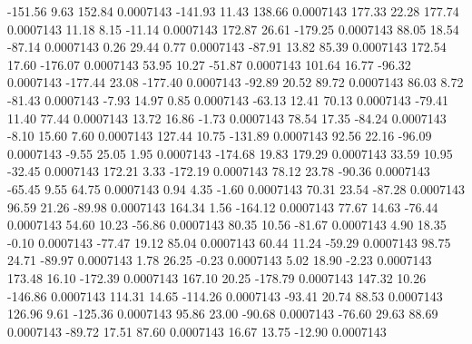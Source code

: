      -151.56        9.63      152.84     0.0007143
     -141.93       11.43      138.66     0.0007143
      177.33       22.28      177.74     0.0007143
       11.18        8.15      -11.14     0.0007143
      172.87       26.61     -179.25     0.0007143
       88.05       18.54      -87.14     0.0007143
        0.26       29.44        0.77     0.0007143
      -87.91       13.82       85.39     0.0007143
      172.54       17.60     -176.07     0.0007143
       53.95       10.27      -51.87     0.0007143
      101.64       16.77      -96.32     0.0007143
     -177.44       23.08     -177.40     0.0007143
      -92.89       20.52       89.72     0.0007143
       86.03        8.72      -81.43     0.0007143
       -7.93       14.97        0.85     0.0007143
      -63.13       12.41       70.13     0.0007143
      -79.41       11.40       77.44     0.0007143
       13.72       16.86       -1.73     0.0007143
       78.54       17.35      -84.24     0.0007143
       -8.10       15.60        7.60     0.0007143
      127.44       10.75     -131.89     0.0007143
       92.56       22.16      -96.09     0.0007143
       -9.55       25.05        1.95     0.0007143
     -174.68       19.83      179.29     0.0007143
       33.59       10.95      -32.45     0.0007143
      172.21        3.33     -172.19     0.0007143
       78.12       23.78      -90.36     0.0007143
      -65.45        9.55       64.75     0.0007143
        0.94        4.35       -1.60     0.0007143
       70.31       23.54      -87.28     0.0007143
       96.59       21.26      -89.98     0.0007143
      164.34        1.56     -164.12     0.0007143
       77.67       14.63      -76.44     0.0007143
       54.60       10.23      -56.86     0.0007143
       80.35       10.56      -81.67     0.0007143
        4.90       18.35       -0.10     0.0007143
      -77.47       19.12       85.04     0.0007143
       60.44       11.24      -59.29     0.0007143
       98.75       24.71      -89.97     0.0007143
        1.78       26.25       -0.23     0.0007143
        5.02       18.90       -2.23     0.0007143
      173.48       16.10     -172.39     0.0007143
      167.10       20.25     -178.79     0.0007143
      147.32       10.26     -146.86     0.0007143
      114.31       14.65     -114.26     0.0007143
      -93.41       20.74       88.53     0.0007143
      126.96        9.61     -125.36     0.0007143
       95.86       23.00      -90.68     0.0007143
      -76.60       29.63       88.69     0.0007143
      -89.72       17.51       87.60     0.0007143
       16.67       13.75      -12.90     0.0007143
